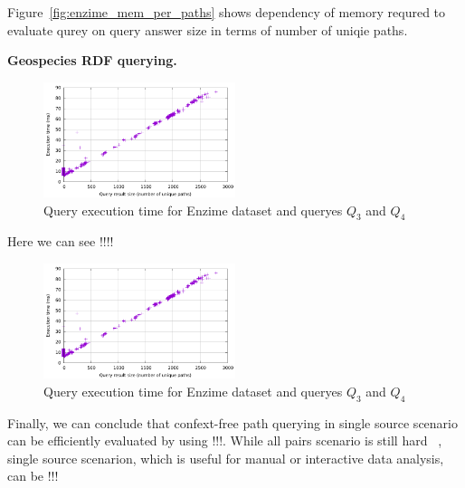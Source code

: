Figure~\ref{fig:enzime_mem_per_paths} shows dependency of memory requred to evaluate qurey on query answer size in terms of number of uniqie paths.


\textbf{Geospecies RDF querying.}

\begin{figure}[ht]
  \begin{center}
    \includegraphics[width=0.5\textwidth]{data/enzime_narrowerTr_time_per_paths.pdf}
    \caption{Query execution time for Enzime dataset and queryes $Q_3$ and $Q_4$}
    \label{fig:geo_time_per_paths}
  \end{center}
\end{figure}

Here we can see !!!!

\begin{figure}[ht]
  \begin{center}
    \includegraphics[width=0.5\textwidth]{data/enzime_narrowerTr_time_per_paths.pdf}
    \caption{Query execution time for Enzime dataset and queryes $Q_3$ and $Q_4$}
    \label{fig:geo_time_per_paths}
  \end{center}
\end{figure}

Finally, we can conclude that confext-free path querying in single source scenario can be efficiently evaluated by using !!!. While all pairs scenario is still hard ~\cite{!!!}, single source scenarion, which is useful for manual or interactive data analysis, can be !!!
